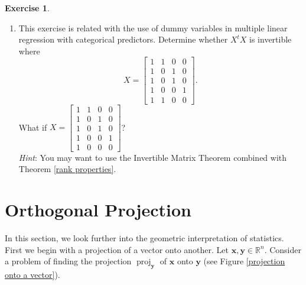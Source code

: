 \documentclass[12pt,letterpaper]{book}
\numberwithin{equation}{section}
\theoremstyle{definition}
\newtheorem{exercise}{\textbf{Exercise}}[chapter]
\newcommand{\vx}{\bm{x}}
\newcommand{\vy}{\bm{y}}
\begin{document}
\begin{exercise}
\begin{enumerate}[\bfseries 1.]
\item This exercise is related with the use of dummy variables in multiple linear regression with categorical predictors. Determine whether $X^tX$ is invertible where $$X=\left[\begin{array}{rrrr} 1 & 1 & 0 & 0 \\ 1 & 0 & 1 & 0 \\ 1 & 0 & 1 & 0 \\ 1 & 0 & 0 & 1 \\ 1 & 1 & 0 & 0  \end{array}\right].$$ What if $X=\left[\begin{array}{rrrr} 1 & 1 & 0 & 0 \\ 1 & 0 & 1 & 0 \\ 1 & 0 & 1 & 0 \\ 1 & 0 & 0 & 1 \\ 1 & 0 & 0 & 0  \end{array}\right]$? \\\textit{Hint}: You may want to use the Invertible Matrix Theorem combined with Theorem \ref{rank properties}.
\end{enumerate}
\end{exercise}

\section{Orthogonal Projection}

In this section, we look further into the geometric interpretation of statistics. First we begin with a projection of a vector onto another. Let $\vx,\vy\in \mathbb{R}^n$. Consider a problem of finding the projection $\operatorname{proj}_{\vy}$ of $\vx$ onto $\vy$ (see Figure \ref{projection onto a vector}). 
\end{document}
